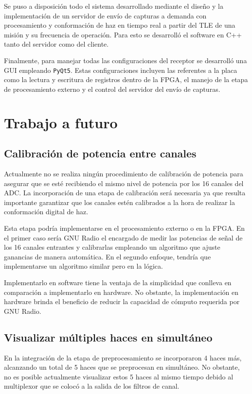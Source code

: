 \documentclass[../../main.tex]{subfiles}
\begin{document}
Se puso a disposición todo el sistema desarrollado mediante el diseño y la implementación de un servidor de envío de capturas a demanda con procesamiento y conformación de haz en tiempo real a partir del TLE de una misión y su frecuencia de operación. Para esto se desarrolló el software en C++ tanto del servidor como del cliente.

Finalmente, para manejar todas las configuraciones del receptor se desarrolló una GUI empleando \texttt{PyQt5}. Estas configuraciones incluyen las referentes a la placa como la lectura y escritura de registros dentro de la FPGA, el manejo de la etapa de procesamiento externo y el control del servidor del envío de capturas.

\section{Trabajo a futuro}
\subsection{Calibración de potencia entre canales}
Actualmente no se realiza ningún procedimiento de calibración de potencia para asegurar que se esté recibiendo el mismo nivel de potencia por los 16 canales del ADC. La incorporación de una etapa de calibración será necesaria ya que resulta importante garantizar que los canales estén calibrados a la hora de realizar la conformación digital de haz.

Esta etapa podría implementarse en el procesamiento externo o en la FPGA. En el primer caso sería GNU Radio el encargado de medir las potencias de señal de los 16 canales entrantes y calibrarlas empleando un algoritmo que ajuste ganancias de manera automática. En el segundo enfoque, tendría que implementarse un algoritmo similar pero en la lógica.

Implementarlo en software tiene la ventaja de la simplicidad que conlleva en comparación a implementarlo en hardware. No obstante, la implementación en hardware brinda el beneficio de reducir la capacidad de cómputo requerida por GNU Radio.

\subsection{Visualizar múltiples haces en simultáneo}
En la integración de la etapa de preprocesamiento se incorporaron 4 haces más, alcanzando un total de 5 haces que se preprocesan en simultáneo. No obstante, no es posible actualmente visualizar estos 5 haces al mismo tiempo debido al multiplexor que se colocó a la salida de los filtros de canal. 
\end{document}
